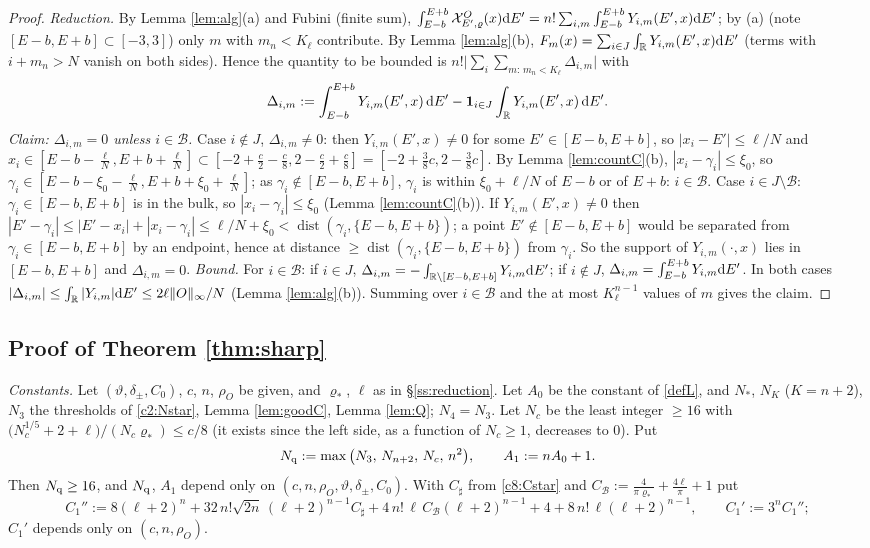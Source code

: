 \begin{proof}
\emph{Reduction.} By Lemma \ref{lem:alg}(a) and Fubini (finite sum), $\int_{E-b}^{E+b}\mathcal{X}^O_{E',\varrho}(x)\mathrm{d} E'=n!\sum_{i,m}\int_{E-b}^{E+b}Y_{i,m}(E',x)\mathrm{d} E'$; by (a) (note $[E-b,E+b]\subset[-3,3]$) only $m$ with $m_n<K_\ell$ contribute.
By Lemma \ref{lem:alg}(b), $F_m(x)=\sum_{i\in J}\int_{\mathbb{R}} Y_{i,m}(E',x)\mathrm{d} E'$ (terms with $i+m_n>N$ vanish on both sides). Hence the quantity to be bounded is $n!\big|\sum_{i}\sum_{m:\,m_n<K_\ell}\Delta_{i,m}\big|$ with
\[
\Delta_{i,m}:=\int_{E-b}^{E+b}Y_{i,m}(E',x)\,\mathrm{d} E'-\mathbf 1_{i\in J}\int_{\mathbb{R}} Y_{i,m}(E',x)\,\mathrm{d} E' .
\]
\emph{Claim: $\Delta_{i,m}=0$ unless $i\in\mathcal B$.}
Case $i\notin J$, $\Delta_{i,m}\ne0$: then $Y_{i,m}(E',x)\ne0$ for some $E'\in[E-b,E+b]$, so $|x_i-E'|\le\ell/N$ and $x_i\in[E-b-\frac\ell N,E+b+\frac\ell N]\subset[-2+\frac c2-\frac c8,2-\frac c2+\frac c8]=[-2+\frac38c,2-\frac38c]$. By Lemma \ref{lem:countC}(b), $|x_i-\gamma_i|\le\xi_0$, so $\gamma_i\in[E-b-\xi_0-\frac\ell N,E+b+\xi_0+\frac\ell N]$; as $\gamma_i\notin[E-b,E+b]$, $\gamma_i$ is within $\xi_0+\ell/N$ of $E-b$ or of $E+b$: $i\in\mathcal B$.
Case $i\in J\setminus\mathcal B$: $\gamma_i\in[E-b,E+b]$ is in the bulk, so $|x_i-\gamma_i|\le\xi_0$ (Lemma \ref{lem:countC}(b)). If $Y_{i,m}(E',x)\ne0$ then $|E'-\gamma_i|\le|E'-x_i|+|x_i-\gamma_i|\le\ell/N+\xi_0<\operatorname{dist}(\gamma_i,\{E-b,E+b\})$; a point $E'\notin[E-b,E+b]$ would be separated from $\gamma_i\in[E-b,E+b]$ by an endpoint, hence at distance $\ge\operatorname{dist}(\gamma_i,\{E-b,E+b\})$ from $\gamma_i$. So the support of $Y_{i,m}(\cdot,x)$ lies in $[E-b,E+b]$ and $\Delta_{i,m}=0$.
\emph{Bound.} For $i\in\mathcal B$: if $i\in J$, $\Delta_{i,m}=-\int_{\mathbb{R}\setminus[E-b,E+b]}Y_{i,m}\mathrm{d} E'$; if $i\notin J$, $\Delta_{i,m}=\int_{E-b}^{E+b}Y_{i,m}\mathrm{d} E'$. In both cases $|\Delta_{i,m}|\le\int_{\mathbb{R}}|Y_{i,m}|\mathrm{d} E'\le2\ell\|O\|_\infty/N$ (Lemma \ref{lem:alg}(b)). Summing over $i\in\mathcal B$ and the at most $K_\ell^{n-1}$ values of $m$ gives the claim.
\end{proof}

\subsection{Proof of Theorem \ref{thm:sharp}}\label{ss:proofsharp}

\noindent\emph{Constants.} Let $(\vartheta,\delta_\pm,C_0)$, $c$, $n$, $\rho_O$ be given, and $\varrho_*$, $\ell$ as in \S\ref{ss:reduction}. Let $A_0$ be the constant of \eqref{defL}, and $N_*$, $N_K$ ($K=n+2$), $N_3$ the thresholds of \eqref{c2:Nstar}, Lemma \ref{lem:goodC}, Lemma \ref{lem:Q}; $N_4=N_3$. Let $N_c$ be the least integer $\ge16$ with
$\big(N_c^{1/5}+2+\ell\big)/(N_c\varrho_*)\le c/8$ (it exists since the left side, as a function of $N_c\ge1$, decreases to $0$). Put
\[
N_{\rm q}:=\max\big(N_3,\,N_{n+2},\,N_c,\,n^2\big),\qquad A_1:=nA_0+1 .
\]
Then $N_{\rm q}\ge16$, and $N_{\rm q}$, $A_1$ depend only on $(c,n,\rho_O,\vartheta,\delta_\pm,C_0)$. With $C_\sharp$ from \eqref{c8:Cstar} and $C_{\mathcal B}:=\frac{4}{\pi\varrho_*}+\frac{4\ell}\pi+1$ put
\[
C_1'':=8(\ell+2)^n+32\,n!\sqrt{2n}\,(\ell+2)^{n-1}C_\sharp+4\,n!\,\ell\,C_{\mathcal B}(\ell+2)^{n-1}+4+8\,n!\,\ell(\ell+2)^{n-1},\qquad C_1':=3^nC_1'' ;
\]
$C_1'$ depends only on $(c,n,\rho_O)$.

